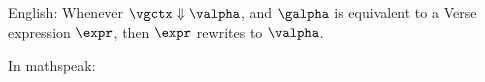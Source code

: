 \documentclass[]{article}
\begin{document}

English: Whenever $\vgctx \Downarrow \valpha$, and $\galpha$ is equivalent to 
a Verse expression $\expr$, then $\expr$ rewrites to $\valpha$. 

In mathspeak: 


\end{document}
